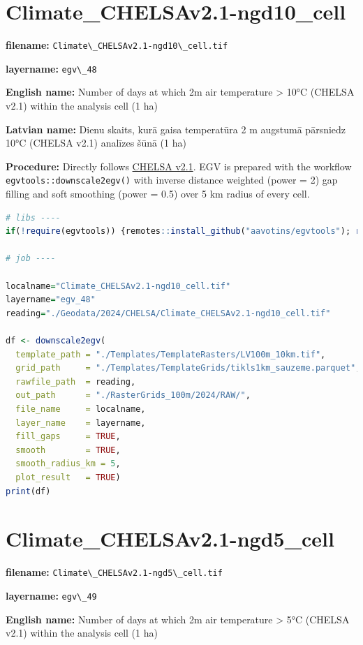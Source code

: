 \documentclass[
]{book}
\newcommand{\passthrough}[1]{#1}
\begin{document}
\section{Climate\_CHELSAv2.1-ngd10\_cell}\label{ch06.048}

\textbf{filename:} \passthrough{\lstinline!Climate\_CHELSAv2.1-ngd10\_cell.tif!}

\textbf{layername:} \passthrough{\lstinline!egv\_48!}

\textbf{English name:} Number of days at which 2m air temperature \textgreater{} 10°C (CHELSA v2.1) within the analysis cell (1 ha)

\textbf{Latvian name:} Dienu skaits, kurā gaisa temperatūra 2 m augstumā pārsniedz 10°C (CHELSA v2.1) analīzes šūnā (1 ha)

\textbf{Procedure:} Directly follows \hyperref[Ch04.11]{CHELSA v2.1}. EGV is prepared with the
workflow \passthrough{\lstinline!egvtools::downscale2egv()!} with inverse distance weighted (power = 2)
gap filling and soft smoothing (power = 0.5) over 5 km radius of every cell.

\begin{lstlisting}[language=R]
# libs ----
if(!require(egvtools)) {remotes::install_github("aavotins/egvtools"); require(egvtools)}

# job ----

localname="Climate_CHELSAv2.1-ngd10_cell.tif"
layername="egv_48"
reading="./Geodata/2024/CHELSA/Climate_CHELSAv2.1-ngd10_cell.tif"

df <- downscale2egv(
  template_path = "./Templates/TemplateRasters/LV100m_10km.tif",
  grid_path     = "./Templates/TemplateGrids/tikls1km_sauzeme.parquet",
  rawfile_path  = reading,
  out_path      = "./RasterGrids_100m/2024/RAW/",
  file_name     = localname,
  layer_name    = layername,
  fill_gaps     = TRUE,
  smooth        = TRUE,
  smooth_radius_km = 5,
  plot_result   = TRUE)
print(df)
\end{lstlisting}

\section{Climate\_CHELSAv2.1-ngd5\_cell}\label{ch06.049}

\textbf{filename:} \passthrough{\lstinline!Climate\_CHELSAv2.1-ngd5\_cell.tif!}

\textbf{layername:} \passthrough{\lstinline!egv\_49!}

\textbf{English name:} Number of days at which 2m air temperature \textgreater{} 5°C (CHELSA v2.1) within the analysis cell (1 ha)
\end{document}
